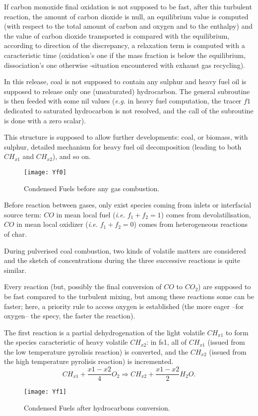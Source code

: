 If carbon monoxide final oxidation is not supposed to be fast, after this
turbulent reaction, the amount of carbon dioxide is null, an equilibrium value
is computed (with respect to the total amount of carbon and oxygen and to the
enthalpy) and the value of carbon dioxide transported is compared with the
equilibrium, according to direction of the discrepancy, a relaxation term is
computed with a caracteristic time (oxidation's one if the mass fraction is
below the equilibrium, dissociation's one otherwise -situation encountered with
exhaust gas recycling).

In this release, coal is not supposed to contain any sulphur and heavy fuel
oil is supposed to release only one (unsaturated) hydrocarbon. The general
subroutine is then feeded with some nil values (\emph{e.g.} in heavy fuel computation,
the tracer $f1$ dedicated to saturated hydrocarbon is not resolved, and the call
of the subroutine is done with a zero scalar).

This structure is supposed to allow further developments: coal, or biomass,
with sulphur, detailed mechanism for heavy fuel oil decomposition (leading to
both $CH_{x1}$ and $CH_{x2}$), and so on.

\begin{figure}[!htpb]
\centerline{\texttt{[image: Yf0]}}
\caption{Condensed Fuels before any gas combustion.} 
\end{figure}
Before reaction between gases, only exist species coming from
inlets or interfacial source term: $CO$ in mean local fuel (\emph{i.e.} $f_1+f_2=1$)
comes from devolatilisation, $CO$ in mean local oxidizer (\emph{i.e.} $f_1+f_2=0$)
comes from heterogeneous reactions of char.

During pulverised coal combustion, two kinds of volatile matters are considered
and the sketch of concentrations during the three successive reactions is quite
similar.

Every reaction (but, possibly the final conversion of $CO$ to $CO_{2}$) are
supposed to be fast compared to the turbulent mixing, but among these reactions
some can be faster; here, a priority rule to access oxygen is established (the
more eager --for oxygen-- the specy, the faster the reaction).

The first reaction is a partial dehydrogenation of the light volatile $CH_{x1}$
to form the species caracteristic of heavy volatile $CH_{x2}$: in fs1, all of
$CH_{x1}$ (issued from the low temperature pyrolisis reaction) is converted, and
the $CH_{x2}$ (issued from the high temperature pyrolisis reaction) is
incremented.
\begin{equation*}
CH_{x1} + \dfrac{x1-x2}{4} O_{2}  \Rightarrow  CH_{x2} + \dfrac{x1-x2}{2} H_{2}O .
\end{equation*}
\begin{figure}[!htpb]
\centerline{\texttt{[image: Yf1]}}
\caption{Condensed Fuels after hydrocarbons conversion.} 
\end{figure}
 
